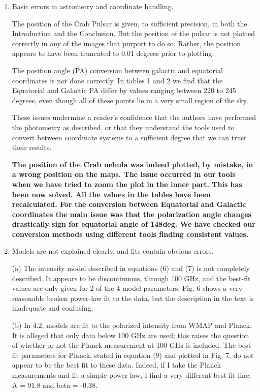 \documentclass[12pt]{article}
\begin{document}
\begin{enumerate}
\item  Basic errors in astrometry and coordinate handling.

The position of the Crab Pulsar is given, to sufficient precision, in
both the Introduction and the Conclusion. But the position of the
pulsar is not plotted correctly in any of the images that purport to
do so. Rather, the position appears to have been truncated to 0.01
degrees prior to plotting.

The position angle (PA) conversion between galactic and equatorial
coordinates is not done correctly. In tables 1 and 2 we find that the
Equatorial and Galactic PA differ by values ranging between 220 to 245
degrees, even though all of these points lie in a very small region of
the sky.

These issues undermine a reader's confidence that the authors have
performed the photometry as described, or that they understand the
tools used to convert between coordinate systems to a sufficient
degree that we can trust their results.

\textbf{The position of the Crab nebula was indeed plotted, by mistake, in a wrong position on the maps. The issue occurred in our tools when we have tried to zoom the plot in the inner part. This has been now solved. All the values in the tables have been recalculated. For the conversion between Equatorial and Galactic coordinates the main issue was that the polarization angle changes drastically sign for equatorial angle of 148deg. We have checked our conversion methods using different tools finding consistent values.}

\item Models are not explained clearly, and fits contain obvious errors.

(a) The intensity model described in equations (6) and (7) is not
completely described. It appears to be discontinuous, through 100
GHz, and the best-fit values are only given for 2 of the 4 model
parameters. Fig. 6 shows a very reasonable broken power-law fit to
the data, but the description in the text is inadequate and confusing.

(b) In 4.2, models are fit to the polarized intensity from WMAP and
Planck. It is alleged that only data below 100 GHz are used; this
raises the question of whether or not the Planck measurement at 100
GHz is included. The best-fit parameters for Planck, stated in
equation (9) and plotted in Fig. 7, do not appear to be the best fit
to these data. Indeed, if I take the Planck measurements and fit a
simple power-law, I find a very different best-fit line: A = 91.8 and
beta = -0.38.


\end{enumerate}
\end{document}
